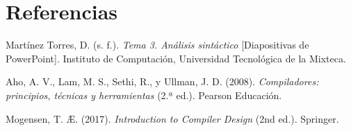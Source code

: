 \section{Referencias}

\vspace{0.5cm}

\noindent
Martínez Torres, D. (s. f.). \textit{Tema 3. Análisis sintáctico} [Diapositivas de PowerPoint].
Instituto de Computación, Universidad Tecnológica de la Mixteca.

\vspace{0.8cm}

\noindent
Aho, A. V., Lam, M. S., Sethi, R., y Ullman, J. D. (2008). \textit{Compiladores: principios,
técnicas y herramientas} (2.ª ed.). Pearson Educación.

\vspace{0.8cm}

\noindent
Mogensen, T. Æ. (2017). \textit{Introduction to Compiler Design} (2nd ed.). Springer.

